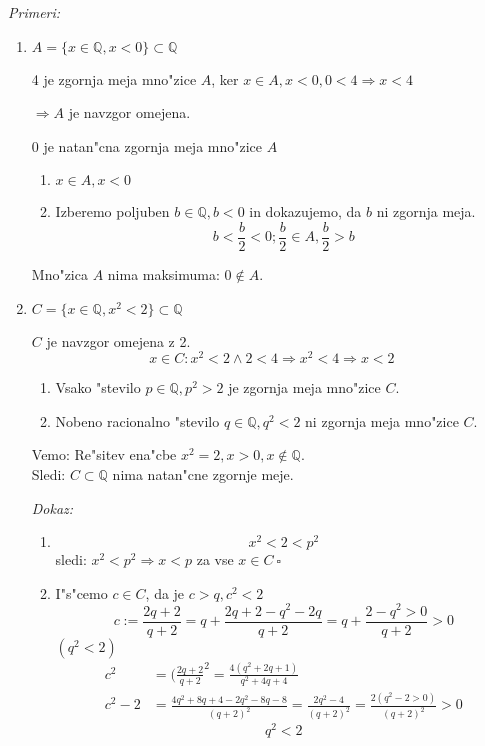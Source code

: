 \emph{Primeri:}
\begin{enumerate}
	\item $A = \{x \in \mathbb{Q}, x < 0\} \subset \mathbb{Q}$
	
	4 je zgornja meja mno"zice $A$, ker $x \in A, x < 0, 0 < 4 \Rightarrow x < 4$
	
	$\Rightarrow A$ je navzgor omejena.
	
	0 je natan"cna zgornja meja mno"zice $A$
	\begin{enumerate}
		\item $x \in A, x < 0$
		\item  Izberemo poljuben $b \in \mathbb{Q}, b < 0$ in dokazujemo, da $b$ ni zgornja meja.
		\[b < \frac{b}{2} < 0; \frac{b}{2} \in A, \frac{b}{2} > b \]
	\end{enumerate}
	Mno"zica $A$ nima maksimuma: $0 \notin A$.
	
	\item $C = \{x \in \mathbb{Q}, x^2 < 2\} \subset \mathbb{Q}$
	
	$C$ je navzgor omejena z 2.
	\[x \in C: x^2 < 2 \land 2 < 4 \Rightarrow x^2 < 4 \Rightarrow x < 2 \]
	\begin{enumerate}
		\item Vsako "stevilo $p \in \mathbb{Q}, p^2 > 2$ je zgornja meja mno"zice $C$.
		\item Nobeno racionalno "stevilo $q \in \mathbb{Q}, q^2 < 2$ ni zgornja meja mno"zice $C$.
	\end{enumerate}

	Vemo: Re"sitev ena"cbe $x^2 = 2, x > 0, x \notin \mathbb{Q}$.\\
	Sledi: $C \subset \mathbb{Q}$ nima natan"cne zgornje meje.
	
	\emph{Dokaz:}
	\begin{enumerate}
		\item \[x^2 < 2 < p^2\]
		sledi: $x^2 < p^2 \Rightarrow x < p$ za vse $x \in C\ \square$
		
		\item I"s"cemo $c \in C$, da je $c > q, c^2 < 2$
		\[c := \frac{2q + 2}{q + 2} = q + \frac{2q + 2 - q^2 - 2q}{q+2} = q + \frac{2 - q^2 > 0}{q + 2} > 0\]
		$(q^2 < 2)$
		\begin{align*}
			c^2 &= (\frac{2q + 2}{q + 2}^2 = \frac{4(q^2 + 2q + 1)}{q^2 + 4q + 4}\\
			c^2 - 2 &=\frac{4q^2 + 8q + 4 - 2q^2 - 8q - 8}{(q + 2)^2} = \frac{2q^2 - 4}{(q+2)^2} = \frac{2(q^2 - 2 > 0)}{(q+2)^2} > 0
		\end{align*}
		\[q^2 < 2\]
	\end{enumerate}
\end{enumerate}

